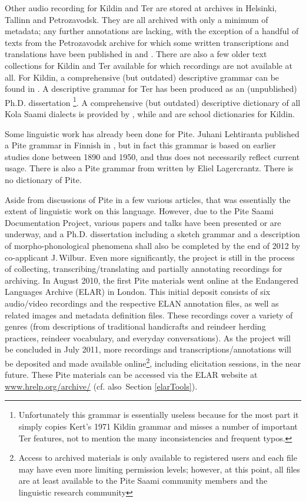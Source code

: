 \documentclass[a4paper,12pt]{article}
\begin{document}
Other audio recording for Kildin and Ter are stored at archives in Helsinki, Tallinn and Petrozavodsk. They are all archived with only a minimum of metadata; any further annotations are lacking, with the exception of a handful of texts from the Petrozavodsk archive for which some written transcriptions and translations have been published in \citealt{kert1961} and \citealt{panfilov-etal1988}. There are also a few older text collections for Kildin and Ter available for which recordings are not available at all. For Kildin, a comprehensive (but outdated) descriptive grammar can be found in \citealt{kert1971}. A descriptive grammar for Ter has been produced as an (unpublished) Ph.D. dissertation \cite{tereskin2002a}\footnote{Unfortunately this grammar is essentially useless because for the most part it simply copies Kert's 1971 Kildin grammar and misses a number of important Ter features, not to mention the many inconsistencies and frequent typos.}. A comprehensive (but outdated) descriptive dictionary of all Kola Saami dialects is provided by \citealt{itkonen_t_i1958a}, while \citealt{kuruc-etal1985} and \citealt{kert1986} are school dictionaries for Kildin.

Some linguistic work has already been done for Pite. Juhani Lehtiranta published a Pite grammar in Finnish in \citeyear{lehtiranta1992}, but in fact this grammar is based on earlier studies done between 1890 and 1950, and thus does not necessarily reflect current usage. There is also a Pite grammar from \citeyear{lagercrantz1926} written by Eliel Lagercrantz. There is no dictionary of Pite.

Aside from discussions of Pite in a few various articles, that was essentially the extent of linguistic work on this language. However, due to the Pite Saami Documentation Project, various papers and talks have been presented or are underway, and a Ph.D. dissertation including a sketch grammar and a description of morpho-phonological phenomena shall also be completed by the end of 2012 by co-applicant J.\,Wilbur. Even more significantly, the project is still in the process of collecting, transcribing/translating and partially annotating recordings for archiving. In August 2010, the first Pite materials went online at the Endangered Languages Archive (ELAR) in London. This initial deposit consists of six audio/video recordings and the respective ELAN annotation files, as well as related images and metadata definition files. These recordings cover a variety of genres (from descriptions of traditional handicrafts and reindeer herding practices, reindeer vocabulary, and everyday conversations). As the project will be concluded in July 2011, more recordings and transcriptions/annotations will be deposited and made available online\footnote{Access to archived materials is only available to registered users and each file may have even more limiting permission levels; however, at this point, all files are at least available to the Pite Saami community members and the linguistic research community}, including elicitation sessions, in the near future. These Pite materials can be accessed via the ELAR website at \url{www.hrelp.org/archive/} (cf. also~Section \ref{elarTools}).
\end{document}
